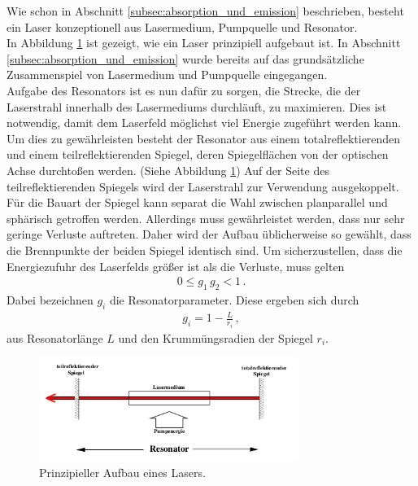 Wie schon in Abschnitt \ref{subsec:absorption_und_emission}
beschrieben, besteht ein Laser konzeptionell aus Lasermedium,
Pumpquelle und Resonator.\\
In Abbildung \ref{fig:laserkonzept} ist gezeigt,
wie ein Laser prinzipiell aufgebaut ist.
In Abschnitt \ref{subsec:absorption_und_emission}
wurde bereits auf das grundsätzliche Zusammenspiel von Lasermedium
und Pumpquelle eingegangen.\\
Aufgabe des Resonators ist es nun dafür zu sorgen,
die Strecke, die der Laserstrahl innerhalb
des Lasermediums durchläuft, zu maximieren. Dies ist notwendig,
damit dem Laserfeld möglichst viel Energie zugeführt
werden kann. Um dies zu gewährleisten besteht der Resonator
aus einem totalreflektierenden und einem teilreflektierenden Spiegel,
deren Spiegelflächen von der optischen Achse durchtoßen werden.
(Siehe Abbildung \ref{fig:laserkonzept})
Auf der Seite des teilreflektierenden Spiegels wird der Laserstrahl
zur Verwendung ausgekoppelt.\\
Für die Bauart der Spiegel kann separat die Wahl zwischen planparallel und
sphärisch getroffen werden. Allerdings muss gewährleistet werden, dass
nur sehr geringe Verluste auftreten. Daher wird
der Aufbau üblicherweise so gewählt, dass die Brennpunkte der beiden Spiegel
identisch sind.
Um sicherzustellen, dass die Energiezufuhr des Laserfelds größer ist als
die Verluste, muss gelten
\begin{align}
  0 \leq g_{1} \, g_{2} \less 1 \, .
\end{align}
Dabei bezeichnen $g_{i}$ die Resonatorparameter.
Diese ergeben sich durch
\begin{align}
  g_{i} = 1 - \frac{L}{r_{i}} \, ,
\end{align}
aus Resonatorlänge $L$ und den Krummüngsradien der Spiegel $r_{i}$.

\FloatBarrier
\begin{figure}
  \centering
  \includegraphics[width=0.75\textwidth]{figures/laserkonzept.png}
  \caption{Prinzipieller Aufbau eines Lasers.\cite{sample}}
  \label{fig:laserkonzept}
\end{figure}
\FloatBarrier

